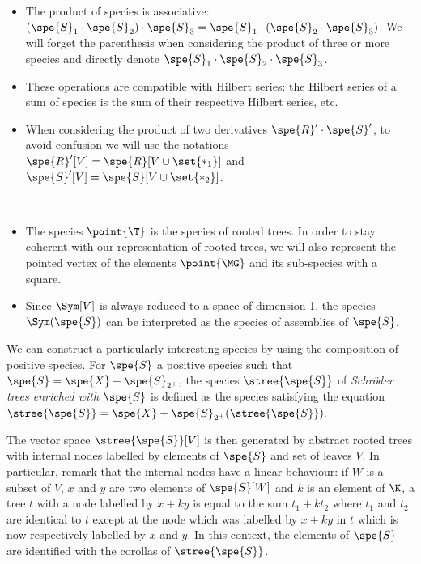 \begin{rema}\label{remark_operations}\
    \begin{itemize}
        \item The product of species is associative: $(\spe{S}_1\cdot\spe{S}_2)\cdot\spe{S}_3 = \spe{S}_1\cdot(\spe{S}_2\cdot\spe{S}_3)$.
        We will forget the parenthesis when considering the product of three or more species and directly denote $\spe{S}_1\cdot\spe{S}_2\cdot\spe{S}_3$.
        \item These operations are compatible with Hilbert series: the Hilbert series of a sum of species is the sum of their respective
        Hilbert series, etc.
        \item When considering the product of two derivatives $\spe{R}'\cdot\spe{S}'$, to avoid confusion we will use 
        the notations $\spe{R}'[V] = \spe{R}[V\cup\set{\ast_1}]$ and $\spe{S}'[V] = \spe{S}[V\cup\set{\ast_2}]$.
    \end{itemize}
\end{rema}

\begin{exam}\label{example_derivation}\
    \begin{itemize}
        \item The species $\point{\T}$ is the species of rooted trees. In order to stay coherent with our representation
        of rooted trees, we will also represent the pointed vertex of the elements $\point{\MG}$ and its sub-species
        with a square.
        \item Since $\Sym[V]$ is always reduced to a space of dimension 1, the species $\Sym(\spe{S})$ can 
        be interpreted as the species of assemblies of $\spe{S}$.
    \end{itemize}
\end{exam}

We can construct a particularly interesting species by using the composition of positive species. For 
$\spe{S}$ a positive species such that $\spe{S} = \spe{X} + \spe{S}_{2^+}$, the species $\stree{\spe{S}}$ 
of {\em Schröder trees enriched with $\spe{S}$} is defined as the species satisfying the equation
\begin{math}
    \stree{\spe{S}} = \spe{X} + \spe{S}_{2^+}(\stree{\spe{S}}).
\end{math}


The vector space $\stree{\spe{S}}[V]$ is then generated by abstract rooted trees with internal nodes labelled
by elements of $\spe{S}$ and set of leaves $V$. In particular, remark that the internal nodes have a linear
behaviour: if $W$ is a subset of $V$, $x$ and $y$ are two elements of $\spe{S}[W]$ and $k$ is an element of
$\K$, a tree $t$ with a node labelled by $x+ky$ is equal to the sum $t_1+kt_2$ where $t_1$ and $t_2$ are
identical to $t$ except at the node which was labelled by $x+ky$ in $t$ which is now respectively labelled by 
$x$ and $y$. In this context, the elements of $\spe{S}$ are identified with the corollas of $\stree{\spe{S}}$.

